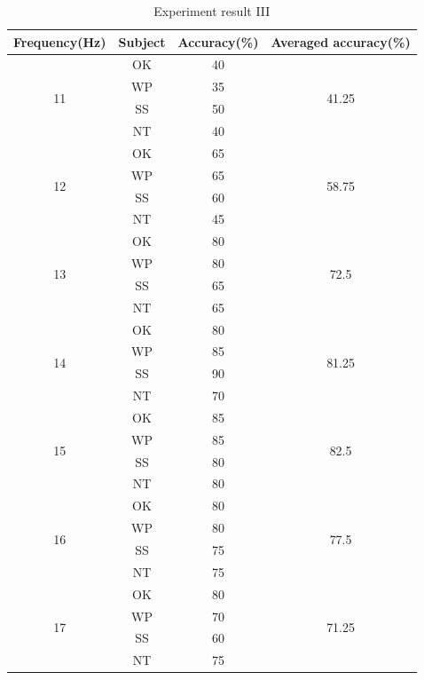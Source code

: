 \begin{table}[ht]
\centering
\begin{tabular}{| c | c | c | c |}

			\hline 
            \textbf{Frequency(Hz)}&\textbf{Subject}&\textbf{Accuracy(\%)}&\textbf{Averaged accuracy(\%)}\\
			\hline 
			\multirow{4}{*}{11}&OK&40&\multirow{4}{*}{41.25} \\
			\cline{2-3}
			&WP&35& \\ \cline{2-3}
			&SS&50& \\ \cline{2-3}
			&NT&40& \\
            \hline
			\multirow{4}{*}{12}&OK&65&\multirow{4}{*}{58.75} \\
			\cline{2-3}
			&WP&65& \\ \cline{2-3}
			&SS&60& \\ \cline{2-3}
			&NT&45& \\
            \hline
           \multirow{4}{*}{13}&OK&80&\multirow{4}{*}{72.5} \\
			\cline{2-3}
			&WP&80& \\ \cline{2-3}
			&SS&65& \\ \cline{2-3}
			&NT&65& \\
            \hline
            \multirow{4}{*}{14}&OK&80&\multirow{4}{*}{81.25} \\
			\cline{2-3}
			&WP&85& \\ \cline{2-3}
			&SS&90& \\ \cline{2-3}
			&NT&70& \\
            \hline
            \multirow{4}{*}{15}&OK&85&\multirow{4}{*}{82.5} \\
			\cline{2-3}
			&WP&85& \\ \cline{2-3}
			&SS&80& \\ \cline{2-3}
			&NT&80& \\
            \hline
            \multirow{4}{*}{16}&OK&80&\multirow{4}{*}{77.5} \\
			\cline{2-3}
			&WP&80& \\ \cline{2-3}
			&SS&75& \\ \cline{2-3}
			&NT&75& \\
            \hline
            \multirow{4}{*}{17}&OK&80&\multirow{4}{*}{71.25} \\
			\cline{2-3}
			&WP&70& \\ \cline{2-3}
			&SS&60& \\ \cline{2-3}
			&NT&75& \\
            \hline
    \end{tabular}
\caption{Experiment result III}
\label{table:result3}
\end{table}

